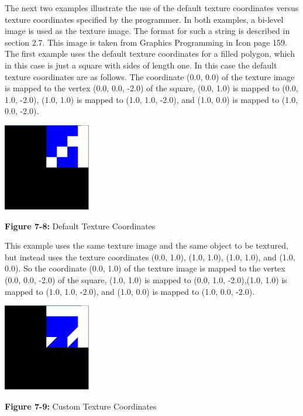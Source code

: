 The next two examples illustrate the use of the default texture
coordinates versus texture coordinates specified by the programmer. In
both examples, a bi-level image is used as the texture image. The
format for such a string is described in section 2.7. This image is
taken from Graphics Programming in Icon page 159. The first example
uses the default texture coordinates for a filled polygon, which in
this case is just a square with sides of length one. In this case the
default texture coordinates are as follows. The coordinate (0.0, 0.0)
of the texture image is mapped to the vertex (0.0, 0.0, -2.0) of the
square, (0.0, 1.0) is mapped to (0.0, 1.0, -2.0), (1.0, 1.0) is mapped
to (1.0, 1.0, -2.0), and (1.0, 0.0) is mapped to (1.0, 0.0, -2.0).

\begin{center}
{\includegraphics[width=1.5in,height=1.5in]{ub-img/ub-img39.jpg}}

{\sffamily\bfseries Figure 7-8:}
{\sffamily Default Texture Coordinates}
\end{center}


This example uses the same texture image and the same object to be
textured, but instead uses the texture coordinates (0.0, 1.0), (1.0,
1.0), (1.0, 1.0), and (1.0, 0.0). So the coordinate (0.0, 1.0) of the
texture image is mapped to the vertex (0.0, 0.0, -2.0) of the square,
(1.0, 1.0) is mapped to (0.0, 1.0, -2.0),(1.0, 1.0) is mapped to (1.0,
1.0, -2.0), and (1.0, 0.0) is mapped to (1.0, 0.0, -2.0).

\begin{center}
{
\includegraphics[width=1.5in,height=1.5in]{ub-img/ub-img40.jpg}}

{\sffamily\bfseries Figure 7-9:}
{\sffamily Custom Texture Coordinates}
\end{center}

